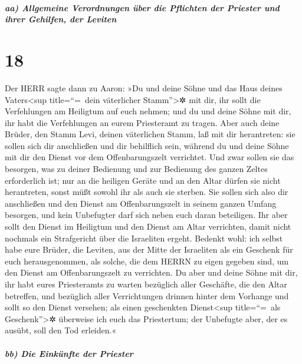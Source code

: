 \hypertarget{aa-allgemeine-verordnungen-uxfcber-die-pflichten-der-priester-und-ihrer-gehilfen-der-leviten}{%
\subparagraph{aa) Allgemeine Verordnungen über die Pflichten der
Priester und ihrer Gehilfen, der
Leviten}\label{aa-allgemeine-verordnungen-uxfcber-die-pflichten-der-priester-und-ihrer-gehilfen-der-leviten}}

\hypertarget{section-17}{%
\section{18}\label{section-17}}

Der HERR sagte dann zu Aaron: »Du und deine Söhne und das
Haus deines Vaters\textless sup title=``=~dein väterlicher
Stamm''\textgreater✲ mit dir, ihr sollt die Verfehlungen am Heiligtum
auf euch nehmen; und du und deine Söhne mit dir, ihr habt die
Verfehlungen an eurem Priesteramt zu tragen. Aber auch
deine Brüder, den Stamm Levi, deinen väterlichen Stamm, laß mit dir
herantreten: sie sollen sich dir anschließen und dir behilflich sein,
während du und deine Söhne mit dir den Dienst vor dem Offenbarungszelt
verrichtet. Und zwar sollen sie das besorgen, was zu
deiner Bedienung und zur Bedienung des ganzen Zeltes erforderlich ist;
nur an die heiligen Geräte und an den Altar dürfen sie nicht
herantreten, sonst müßt sowohl ihr als auch sie sterben.
Sie sollen sich also dir anschließen und den Dienst am
Offenbarungszelt in seinem ganzen Umfang besorgen, und kein Unbefugter
darf sich neben euch daran beteiligen. Ihr aber sollt den
Dienst im Heiligtum und den Dienst am Altar verrichten, damit nicht
nochmals ein Strafgericht über die Israeliten ergeht.
Bedenkt wohl: ich selbst habe eure Brüder, die Leviten,
aus der Mitte der Israeliten als ein Geschenk für euch herausgenommen,
als solche, die dem HERRN zu eigen gegeben sind, um den Dienst am
Offenbarungszelt zu verrichten. Du aber und deine Söhne
mit dir, ihr habt eures Priesteramts zu warten bezüglich aller
Geschäfte, die den Altar betreffen, und bezüglich aller Verrichtungen
drinnen hinter dem Vorhange und sollt so den Dienst versehen; als einen
geschenkten Dienst\textless sup title=``=~als Geschenk''\textgreater✲
überweise ich euch das Priestertum; der Unbefugte aber, der es ausübt,
soll den Tod erleiden.«

\hypertarget{bb-die-einkuxfcnfte-der-priester}{%
\subparagraph{bb) Die Einkünfte der
Priester}\label{bb-die-einkuxfcnfte-der-priester}}

